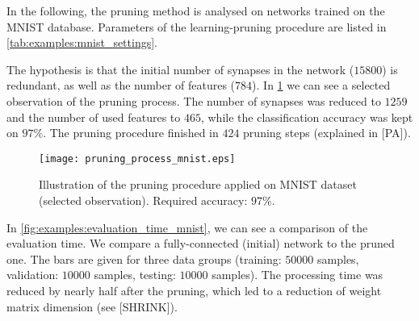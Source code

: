 In the following, the pruning method is analysed on networks trained on the MNIST database. Parameters of the learning-pruning procedure are listed in \cref{tab:examples:mnist_settings}.

\begin{table}[H]
\centering
{}
\caption{Experiment settings for the MNIST example.}
\label{tab:examples:mnist_settings}
\end{table}

The hypothesis is that the initial number of synapses in the network ($ 15800 $) is redundant, as well as the number of features ($ 784 $). In \cref{fig:examples:pruning_process_mnist} we can see a selected observation of the pruning process. The number of synapses was reduced to $ 1259 $ and the number of used features to $ 465 $, while the classification accuracy was kept on $ 97\% $. The pruning procedure finished in $ 424 $ pruning steps (explained in [PA]).

\begin{figure}[H]
\centering
\texttt{[image: pruning\_process\_mnist.eps]}
\caption{Illustration of the pruning procedure applied on MNIST dataset (selected observation). Required accuracy: $ 97\% $.}
\label{fig:examples:pruning_process_mnist}
\end{figure}

In \cref{fig:examples:evaluation_time_mnist}, we can see a comparison of the evaluation time. We compare a fully-connected (initial) network to the pruned one. The bars are given for three data groups (training: $ 50000 $ samples, validation: $ 10000 $ samples, testing: $ 10000 $ samples). The processing time was reduced by nearly half after the pruning, which led to a reduction of weight matrix dimension (see [SHRINK]).

